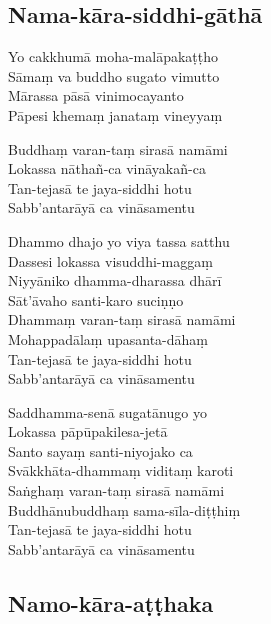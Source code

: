 \subsection{Nama-kāra-siddhi-gāthā}
\label{yo-cakkhuma}


\begin{paritta}
Yo cakkhumā moha-malāpakaṭṭho\\
Sāmaṃ va buddho sugato vimutto\\
Mārassa pāsā vinimocayanto\\
Pāpesi khemaṃ janataṃ vineyyaṃ\\
\end{paritta}

\clearpage

\begin{paritta}
Buddhaṃ varan-taṃ sirasā namāmi\\
Lokassa nāthañ-ca vināyakañ-ca\\
Tan-tejasā te jaya-siddhi hotu\\
Sabb'antarāyā ca vināsamentu

Dhammo dhajo yo viya tassa satthu\\
Dassesi lokassa visuddhi-maggaṃ\\
Niyyāniko dhamma-dharassa dhārī\\
Sāt'āvaho santi-karo suciṇṇo\\
Dhammaṃ varan-taṃ sirasā namāmi\\
Mohappadālaṃ upasanta-dāhaṃ\\
Tan-tejasā te jaya-siddhi hotu\\
Sabb'antarāyā ca vināsamentu

Saddhamma-senā sugatānugo yo\\
Lokassa pāpūpakilesa-jetā\\
Santo sayaṃ santi-niyojako ca\\
Svākkhāta-dhammaṃ viditaṃ karoti\\
Saṅghaṃ varan-taṃ sirasā namāmi\\
Buddhānubuddhaṃ sama-sīla-diṭṭhiṃ\\
Tan-tejasā te jaya-siddhi hotu\\
Sabb'antarāyā ca vināsamentu
\end{paritta}


\clearpage

\subsection{Namo-kāra-aṭṭhaka}
\label{namo-arahato}

